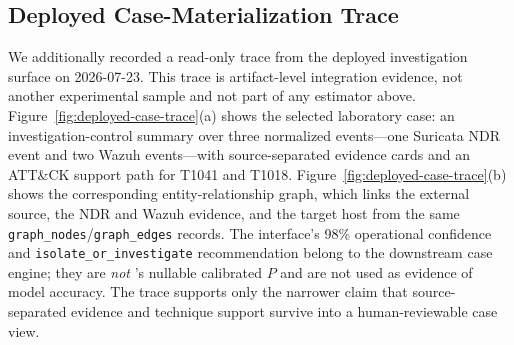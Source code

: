 \subsection{Deployed Case-Materialization Trace}
\label{sec:deployed-case-trace}

\begin{sloppypar}
We additionally recorded a read-only trace from the deployed investigation surface on
2026-07-23. This trace is artifact-level integration evidence, not another experimental sample
and not part of any estimator above. Figure~\ref{fig:deployed-case-trace}(a) shows the selected
laboratory case: an investigation-control summary over three normalized events---one Suricata NDR
event and two Wazuh events---with source-separated evidence cards and an ATT\&CK support path for
T1041 and T1018. Figure~\ref{fig:deployed-case-trace}(b) shows the corresponding entity-relationship
graph, which links the external source, the NDR and Wazuh evidence, and the target host from the same
\texttt{graph\_nodes}/\texttt{graph\_edges} records. The interface's 98\% operational confidence and
\texttt{isolate\_or\_investigate} recommendation belong to the downstream case engine; they are
\emph{not} \trustepisode's nullable calibrated $P$ and are not used as evidence of model accuracy.
The trace supports only the narrower claim that source-separated evidence and technique support
survive into a human-reviewable case view.
\end{sloppypar}


